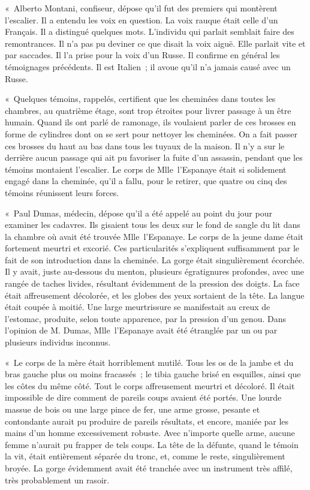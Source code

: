 \documentclass[french,twoside]{book} %
\begin{document}
« Alberto Montani, confiseur, dépose qu’il fut des premiers qui montèrent l’escalier. Il a entendu les voix en question. La voix rauque était celle d’un Français. Il a distingué quelques mots. L’individu qui parlait semblait faire des remontrances. Il n’a pas pu deviner ce que disait la voix aiguë. Elle parlait vite et par saccades. Il l’a prise pour la voix d’un Russe. Il confirme en général les témoignages précédents. Il est Italien ; il avoue qu’il n’a jamais causé avec un Russe.\par
« Quelques témoins, rappelés, certifient que les cheminées dans toutes les chambres, au quatrième étage, sont trop étroites pour livrer passage à un être humain. Quand ils ont parlé de ramonage, ils voulaient parler de ces brosses en forme de cylindres dont on se sert pour nettoyer les cheminées. On a fait passer ces brosses du haut au bas dans tous les tuyaux de la maison. Il n’y a sur le derrière aucun passage qui ait pu favoriser la fuite d’un assassin, pendant que les témoins montaient l’escalier. Le corps de Mlle l’Espanaye était si solidement engagé dans la cheminée, qu’il a fallu, pour le retirer, que quatre ou cinq des témoins réunissent leurs forces.\par
« Paul Dumas, médecin, dépose qu’il a été appelé au point du jour pour examiner les cadavres. Ils gisaient tous les deux sur le fond de sangle du lit dans la chambre où avait été trouvée Mlle l’Espanaye. Le corps de la jeune dame était fortement meurtri et excorié. Ces particularités s’expliquent suffisamment par le fait de son introduction dans la cheminée. La gorge était singulièrement écorchée. Il y avait, juste au-dessous du menton, plusieurs égratignures profondes, avec une rangée de taches livides, résultant évidemment de la pression des doigts. La face était affreusement décolorée, et les globes des yeux sortaient de la tête. La langue était coupée à moitié. Une large meurtrissure se manifestait au creux de l’estomac, produite, selon toute apparence, par la pression d’un genou. Dans l’opinion de M. Dumas, Mlle l’Espanaye avait été étranglée par un ou par plusieurs individus inconnus.\par
« Le corps de la mère était horriblement mutilé. Tous les os de la jambe et du bras gauche plus ou moins fracassés ; le tibia gauche brisé en esquilles, ainsi que les côtes du même côté. Tout le corps affreusement meurtri et décoloré. Il était impossible de dire comment de pareils coups avaient été portés. Une lourde massue de bois ou une large pince de fer, une arme grosse, pesante et contondante aurait pu produire de pareils résultats, et encore, maniée par les mains d’un homme excessivement robuste. Avec n’importe quelle arme, aucune femme n’aurait pu frapper de tels coups. La tête de la défunte, quand le témoin la vit, était entièrement séparée du tronc, et, comme le reste, singulièrement broyée. La gorge évidemment avait été tranchée avec un instrument très affilé, très probablement un rasoir.\par
\end{document}
